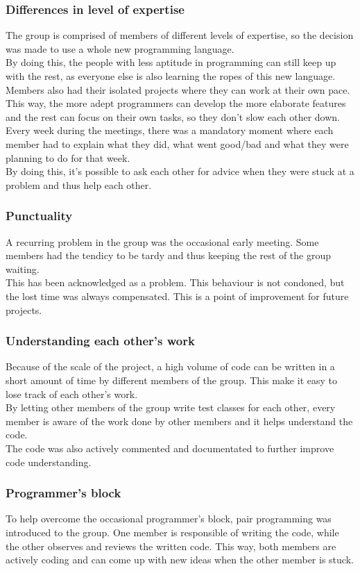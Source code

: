 \documentclass[10pt,a4paper]{report}
\begin{document}
			\subsubsection*{Differences in level of expertise}
				The group is comprised of members of different levels of expertise, so the decision was made to use a whole new programming language.\\ 
				By doing this, the people with less aptitude in programming can still keep up with the rest, as everyone else is also learning the ropes of this new language.\\
				Members also had their isolated projects where they can work at their own pace. This way, the more adept programmers can develop the more elaborate features and the rest can focus on their own tasks, so they don't slow each other down.\\ 
				Every week during the meetings, there was a mandatory moment where each member had to explain what they did, what went good/bad and what they were planning to do for that week.\\ 
				By doing this, it's possible to ask each other for advice when they were stuck at a problem and thus help each other.
			\subsubsection*{Punctuality}
				A recurring problem in the group was the occasional early meeting. Some members had the tendicy to be tardy and thus keeping the rest of the group waiting. \\
				This has been acknowledged as a problem. This behaviour is not condoned, but the lost time was always compensated. This is a point of improvement for future projects.
			\subsubsection*{Understanding each other's work}
				Because of the scale of the project, a high volume of code can be written in a short amount of time by different members of the group. This make it easy to lose track of each other's work. \\
				By letting other members of the group write test classes for each other, every member is aware of the work done by other members and it helps understand the code. \\
				The code was also actively commented and documentated to further improve code understanding.
			\subsubsection*{Programmer's block}
				To help overcome the occasional programmer's block, pair programming was introduced to the group. One member is responsible of writing the code, while the other observes and reviews the written code. This way, both members are actively coding and can come up with new ideas when the other member is stuck.
\end{document}
